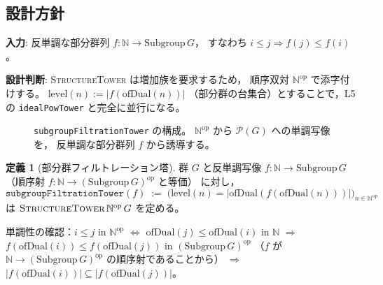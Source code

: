 \documentclass[a4paper,11pt]{ltjsarticle}
\theoremstyle{definition}
\newtheorem{definition}{定義}[section]
\theoremstyle{plain}
\theoremstyle{remark}
\begin{document}
\subsection{設計方針}

\textbf{入力}: 反単調な部分群列
$f\colon \mathbb{N} \to \mathrm{Subgroup}\,G$，
すなわち $i \leq j \Rightarrow f(j) \leq f(i)$。

\textbf{設計判断}: \textsc{StructureTower} は増加族を要求するため，
順序双対 $\mathbb{N}^{\mathrm{op}}$ で添字付けする。
$\mathrm{level}(n) := \lvert f(\mathrm{ofDual}(n))\rvert$
（部分群の台集合）とすることで，L5 の \texttt{idealPowTower} と完全に並行になる。

\begin{figure}[H]
\centering
{}
\caption{\texttt{subgroupFiltrationTower} の構成。
$\mathbb{N}^{\mathrm{op}}$ から $\mathcal{P}(G)$ への単調写像を，
反単調な部分群列 $f$ から誘導する。}
\label{fig:subgroup-tower-construction}
\end{figure}

\begin{definition}[部分群フィルトレーション塔]\label{def:subgroup-filtration-tower}
  群 $G$ と反単調写像 $f\colon \mathbb{N} \to \mathrm{Subgroup}\,G$
  （順序射 $f\colon \mathbb{N} \to (\mathrm{Subgroup}\,G)^{\mathrm{op}}$ と等価）
  に対し，
  \[
    \texttt{subgroupFiltrationTower}(f)
    \;:=\;
    \bigl(\mathrm{level}(n) = \lvert\mathrm{ofDual}(f(\mathrm{ofDual}(n)))\rvert\bigr)_{n \in \mathbb{N}^{\mathrm{op}}}
  \]
  は $\textsc{StructureTower}\,\mathbb{N}^{\mathrm{op}}\,G$ を定める。
\end{definition}

\begin{proofstrategy}
単調性の確認：$i \leq j$ in $\mathbb{N}^{\mathrm{op}}$
$\Leftrightarrow$ $\mathrm{ofDual}(j) \leq \mathrm{ofDual}(i)$ in $\mathbb{N}$
$\Rightarrow$ $f(\mathrm{ofDual}(i)) \leq f(\mathrm{ofDual}(j))$ in $(\mathrm{Subgroup}\,G)^{\mathrm{op}}$
（$f$ が $\mathbb{N} \to (\mathrm{Subgroup}\,G)^{\mathrm{op}}$ の順序射であることから）
$\Rightarrow$ $\lvert f(\mathrm{ofDual}(i))\rvert \subseteq \lvert f(\mathrm{ofDual}(j))\rvert$。
\end{proofstrategy}
\end{document}
